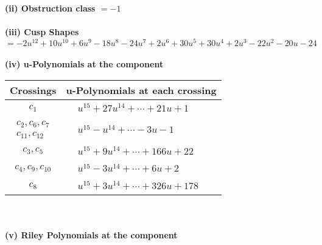 \documentclass[1p]{elsarticle_modified}
\theoremstyle{definition}
\begin{document}
\flushleft \textbf{(ii) Obstruction class $= -1$}\\~\\
\flushleft \textbf{(iii) Cusp Shapes $= -2 u^{12}+10 u^{10}+6 u^9-18 u^8-24 u^7+2 u^6+30 u^5+30 u^4+2 u^3-22 u^2-20 u-24$}\\~\\
\newpage\renewcommand{\arraystretch}{1}
\flushleft \textbf{(iv) u-Polynomials at the component}\newline \\
\begin{tabular}{m{50pt}|m{274pt}}
Crossings & \hspace{64pt}u-Polynomials at each crossing \\
\hline $$\begin{aligned}c_{1}\end{aligned}$$&$\begin{aligned}
&u^{15}+27 u^{14}+\cdots+21 u+1
\end{aligned}$\\
\hline $$\begin{aligned}c_{2},c_{6},c_{7}\\c_{11},c_{12}\end{aligned}$$&$\begin{aligned}
&u^{15}- u^{14}+\cdots-3 u-1
\end{aligned}$\\
\hline $$\begin{aligned}c_{3},c_{5}\end{aligned}$$&$\begin{aligned}
&u^{15}+9 u^{14}+\cdots+166 u+22
\end{aligned}$\\
\hline $$\begin{aligned}c_{4},c_{9},c_{10}\end{aligned}$$&$\begin{aligned}
&u^{15}-3 u^{14}+\cdots+6 u+2
\end{aligned}$\\
\hline $$\begin{aligned}c_{8}\end{aligned}$$&$\begin{aligned}
&u^{15}+3 u^{14}+\cdots+326 u+178
\end{aligned}$\\
\hline
\end{tabular}\\~\\
\newpage\renewcommand{\arraystretch}{1}
\flushleft \textbf{(v) Riley Polynomials at the component}\newline \\
\end{document}
